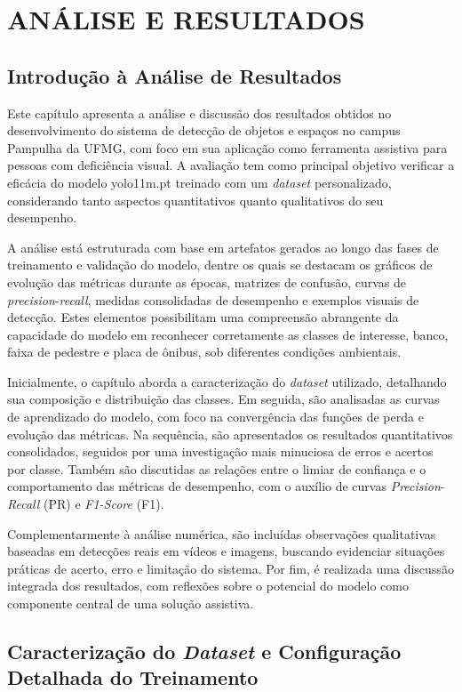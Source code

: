 \chapter{\textbf{ANÁLISE E RESULTADOS}}
\section{\textbf{Introdução à Análise de Resultados}}

Este capítulo apresenta a análise e discussão dos resultados obtidos no desenvolvimento do sistema de detecção de objetos e espaços no campus Pampulha da UFMG, com foco em sua aplicação como ferramenta assistiva para pessoas com deficiência visual. A avaliação tem como principal objetivo verificar a eficácia do modelo yolo11m.pt treinado com um \textit{dataset} personalizado, considerando tanto aspectos quantitativos quanto qualitativos do seu desempenho.

A análise está estruturada com base em artefatos gerados ao longo das fases de treinamento e validação do modelo, dentre os quais se destacam os gráficos de evolução das métricas durante as épocas, matrizes de confusão, curvas de \textit{precision}-\textit{recall}, medidas consolidadas de desempenho e exemplos visuais de detecção. Estes elementos possibilitam uma compreensão abrangente da capacidade do modelo em reconhecer corretamente as classes de interesse, banco, faixa de pedestre e placa de ônibus, sob diferentes condições ambientais.

Inicialmente, o capítulo aborda a caracterização do \textit{dataset} utilizado, detalhando sua composição e distribuição das classes. Em seguida, são analisadas as curvas de aprendizado do modelo, com foco na convergência das funções de perda e evolução das métricas. Na sequência, são apresentados os resultados quantitativos consolidados, seguidos por uma investigação mais minuciosa de erros e acertos por classe. Também são discutidas as relações entre o limiar de confiança e o comportamento das métricas de desempenho, com o auxílio de curvas \textit{Precision}-\textit{Recall} (PR) e \textit{F1-Score} (F1).

Complementarmente à análise numérica, são incluídas observações qualitativas baseadas em detecções reais em vídeos e imagens, buscando evidenciar situações práticas de acerto, erro e limitação do sistema. Por fim, é realizada uma discussão integrada dos resultados, com reflexões sobre o potencial do modelo como componente central de uma solução assistiva.

\section{\textbf{Caracterização do \textit{Dataset} e Configuração Detalhada do Treinamento}}

